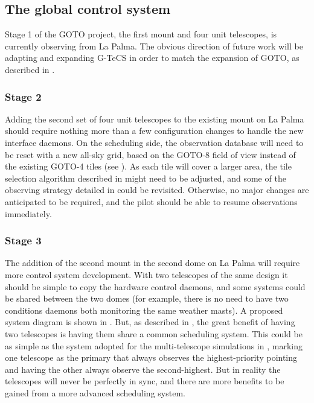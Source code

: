 \subsection{The global control system}
\label{sec:gtecs_future}
\begin{colsection}

Stage 1 of the GOTO project, the first mount and four unit telescopes, is currently observing from La Palma. The obvious direction of future work will be adapting and expanding G-TeCS in order to match the expansion of GOTO, as described in .

\subsubsection{Stage 2}

Adding the second set of four unit telescopes to the existing mount on La Palma should require nothing more than a few configuration changes to handle the new interface daemons. On the scheduling side, the observation database will need to be reset with a new all-sky grid, based on the GOTO-8 field of view instead of the existing GOTO-4 tiles (see ). As each tile will cover a larger area, the tile selection algorithm described in  might need to be adjusted, and some of the observing strategy detailed in  could be revisited. Otherwise, no major changes are anticipated to be required, and the pilot should be able to resume observations immediately.

\subsubsection{Stage 3}

The addition of the second mount in the second dome on La Palma will require more control system development. With two telescopes of the same design it should be simple to copy the hardware control daemons, and some systems could be shared between the two domes (for example, there is no need to have two conditions daemons both monitoring the same weather masts). A proposed system diagram is shown in . But, as described in , the great benefit of having two telescopes is having them share a common scheduling system. This could be as simple as the system adopted for the multi-telescope simulations in , marking one telescope as the primary that always observes the highest-priority pointing and having the other always observe the second-highest. But in reality the telescopes will never be perfectly in sync, and there are more benefits to be gained from a more advanced scheduling system.


\end{colsection}
